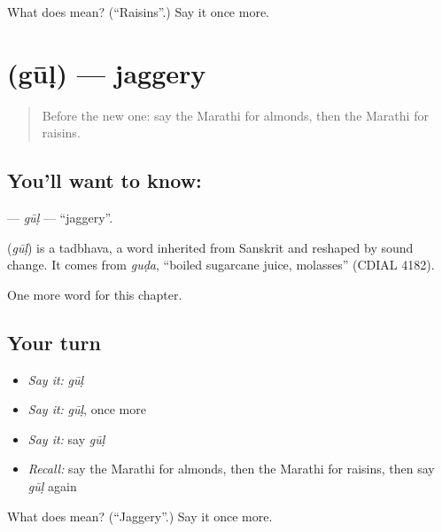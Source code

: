 \begin{tcolorbox}[breakable,colback=teal!4,colframe=teal!35!black,title={Before you move on}]
What does  mean? (\textquotedblleft{}Raisins\textquotedblright{}.) Say it once more.
\end{tcolorbox}
\section[\texorpdfstring{\mr{गूळ} (gūḷ)}{गूळ (gūḷ)}]{ (gūḷ) — jaggery}

\label{lesson:MR-C270-gul}



\begin{quote}
Before the new one: say the Marathi for almonds, then the Marathi for raisins.
\end{quote}

\subsection*{You'll want to know: }
\textbf{} — \emph{gūḷ} — \textquotedblleft{}jaggery\textquotedblright{}.

\begin{cousinweb}
\textbf{} (\emph{gūḷ}) is a tadbhava, a word inherited from Sanskrit and reshaped by sound change. It comes from \emph{guḍa}, \textquotedblleft{}boiled sugarcane juice, molasses\textquotedblright{} (CDIAL 4182).
\end{cousinweb}

\begin{grammarlens}[title={What you've built}]
One more word for this chapter.
\end{grammarlens}

\subsection*{Your turn}
\begin{itemize}
\raggedright
  \item \emph{Say it:} \emph{gūḷ}
  \item \emph{Say it:} \emph{gūḷ}, once more
  \item \emph{Say it:} say \emph{gūḷ}
  \item \emph{Recall:} say the Marathi for almonds, then the Marathi for raisins, then say \emph{gūḷ} again
\end{itemize}

\begin{tcolorbox}[breakable,colback=teal!4,colframe=teal!35!black,title={Before you move on}]
What does  mean? (\textquotedblleft{}Jaggery\textquotedblright{}.) Say it once more.
\end{tcolorbox}

